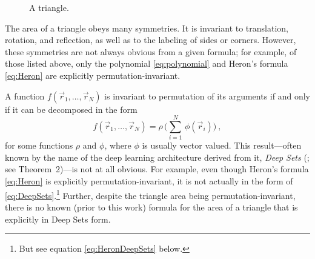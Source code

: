 \documentclass[10pt]{article}
\begin{document}
\begin{figure}[t!]
    \caption{A triangle.}
    \label{fig:triangle}
\end{figure}

The area of a triangle obeys many symmetries. It is invariant to translation, rotation, and reflection, as well as to the labeling of sides or corners. However, these symmetries are not always obvious from a given formula; for example, of those listed above, only the polynomial \eqref{eq:polynomial} and Heron's formula \eqref{eq:Heron} are explicitly permutation-invariant.

A function $f(\vec{r}_1, \dots, \vec{r}_N)$ is invariant to permutation of its arguments if and only if it can be decomposed in the form
\begin{equation}
    f(\vec{r}_1, \dots, \vec{r}_N) = \rho \, \big( \sum_{i=1}^{N} \, \phi(\vec{r}_i) \big)~,\label{eq:DeepSets}
\end{equation}
for some functions $\rho$ and $\phi$, where $\phi$ is usually vector valued.
This result---often known by the name of the deep learning architecture derived from it, \emph{Deep Sets} (\citealt{Zaheer+17deepsets}; see Theorem~2)---is not at all obvious.
For example, even though Heron's formula \eqref{eq:Heron} is explicitly permutation-invariant, it is not actually in the form of \eqref{eq:DeepSets}.\footnote{But see equation \eqref{eq:HeronDeepSets} below.}
Further, despite the triangle area being permutation-invariant, there is no known (prior to this work) formula for the area of a triangle that is explicitly in Deep Sets form.
\end{document}
